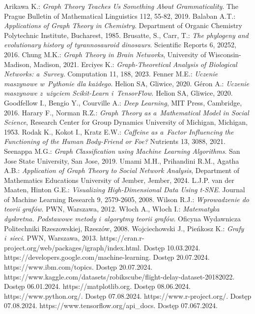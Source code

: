 
\begin{thebibliography}{4}
     Arikawa K.: \textit{Graph Theory Teaches Us Something About Grammaticality}. The Prague Bulletin of Mathematical Linguistics 112, 55-82, 2019.
     Balaban A.T.: \textit{Applications of Graph Theory in Chemistry}. Department of Organic Chemistry Polytechnic Institute, Bucharest, 1985.
     Brusatte, S., Carr, T.: \textit{The phylogeny and evolutionary history of tyrannosauroid dinosaurs}. Scientific Reports 6, 20252, 2016.
     Chung M.K.: \textit{Graph Theory in Brain Networks}, University of Wisconsin-Madison, Madison, 2021.
     Erciyes K.: \textit{Graph-Theoretical Analysis of Biological Networks: a~Survey}. Computation 11, 188, 2023.
     Fenner M.E.: \textit{Uczenie maszynowe w~Pythonie dla każdego}. Helion SA, Gliwice, 2020.
     Géron A.: \textit{Uczenie maszynowe z~użyciem Scikit-Learn i~TensorFlow}. Helion SA, Gliwice, 2020.
     Goodfellow I., Bengio Y., Courville A.: \textit{Deep Learning}, MIT Press, Cambridge, 2016.
     Harary F., Norman R.Z.: \textit{Graph Theory as a~Mathematical Model in Social Science}, Research Center for Group Dynamics University of Michigan, Michigan, 1953.
     Rodak K., Kokot I., Kratz E.W.: \textit{Caffeine as a~Factor Influencing the Functioning of the Human Body-Friend or Foe?} Nutrients 13, 3088, 2021.
     Seenappa M.G.: \textit{Graph Classification using Machine Learning Algorithms}. San Jose State University, San Jose, 2019.
     Umami M.H., Prihandini R.M., Agatha A.B.: \textit{Application of Graph Theory to Social Network Analysis}, Department of Mathematics Educations University of Jember, Jember, 2024.
     L.J.P. van der Maaten, Hinton G.E.: \textit{Visualizing High-Dimensional Data Using t-SNE}. Journal of Machine Learning Research 9, 2579-2605, 2008.
     Wilson R.J.: \textit{Wprowadzenie do teorii grafów}. PWN, Warszawa, 2012.
     Włoch A., Włoch I.: \textit{Matematyka dyskretna. Podstawowe metody i~algorytmy teorii grafów}. Oficyna Wydawnicza Politechniki Rzeszowskiej, Rzeszów, 2008.
     Wojciechowski J., Pieńkosz K.: \textit{Grafy i~sieci}. PWN, Warszawa, 2013.
     https://cran.r-project.org/web/packages/igraph/index.html. Dostęp 10.03.2024.
     https://developers.google.com/machine-learning. Dostęp 20.07.2024.
     https://www.ibm.com/topics. Dostęp 20.07.2024.
     https://www.kaggle.com/datasets/robikscube/flight-delay-dataset-20182022. Dostęp 06.01.2024.
     https://matplotlib.org. Dostęp 08.06.2024.
     https://www.python.org/. Dostęp 07.08.2024.
     https://www.r-project.org/. Dostęp 07.08.2024.
     https://www.tensorflow.org/api\_docs. Dostęp 07.067.2024.
\end{thebibliography}